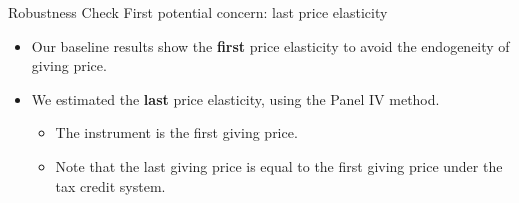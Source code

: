\documentclass[
  ignorenonframetext,
  aspectratio=169,
]{beamer}
\providecommand{\tightlist}{%
  \setlength{\itemsep}{0pt}\setlength{\parskip}{0pt}}
\begin{document}
\begin{frame}{Robustness Check}
\protect\hypertarget{robustness-check}{}
First potential concern: last price elasticity

\begin{itemize}
\tightlist
\item
  Our baseline results show the \textbf{first} price elasticity to avoid the endogeneity of giving price.
\item
  We estimated the \textbf{last} price elasticity, using the Panel IV method.

  \begin{itemize}
  \tightlist
  \item
    The instrument is the first giving price.
  \item
    Note that the last giving price is equal to the first giving price under the tax credit system.
  \end{itemize}
\end{itemize}
\end{frame}
\end{document}

